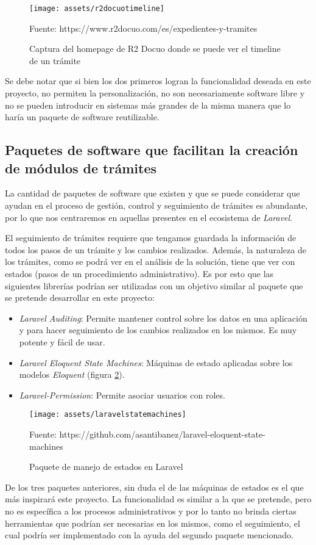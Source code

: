 \begin{figure}[!htpb]
    \centering
    \texttt{[image: assets/r2docuotimeline]}
    \caption{Captura del homepage de R2 Docuo donde se puede ver el timeline de un trámite}{Fuente: https://www.r2docuo.com/es/expedientes-y-tramites}
    \label{fig:r2docuotimeline}
\end{figure}

Se debe notar que si bien los dos primeros logran la funcionalidad deseada en este proyecto, no permiten la personalización, no son necesariamente software libre y no se pueden introducir en sistemas más grandes de la misma manera que lo haría un paquete de software reutilizable.

\subsection{Paquetes de software que facilitan la creación de módulos de trámites}

La cantidad de paquetes de software que existen y que se puede considerar que ayudan en el proceso de gestión, control y seguimiento de trámites es abundante, por lo que nos centraremos en aquellas presentes en el ecosistema de \textit{Laravel}.

El seguimiento de trámites requiere que tengamos guardada la información de todos los pasos de un trámite y los cambios realizados. Además, la naturaleza de los trámites, como se podrá ver en el análisis de la solución, tiene que ver con estados (pasos de un procedimiento administrativo). Es por esto que las siguientes librerías podrían ser utilizadas con un objetivo similar al paquete que se pretende desarrollar en este proyecto:

\begin{itemize}
    \item \textit{Laravel Auditing}: Permite mantener control sobre los datos en una aplicación y para hacer seguimiento de los cambios realizados en los mismos. Es muy potente y fácil de usar.
    \item \textit{Laravel Eloquent State Machines}: Máquinas de estado aplicadas sobre los modelos \textit{Eloquent} (figura \ref{fig:laravelstatemachines}).
    \item \textit{Laravel-Permission}: Permite asociar usuarios con roles.
\end{itemize}

\begin{figure}[!htpb]
    \centering
    \texttt{[image: assets/laravelstatemachines]}
    \caption{Paquete de manejo de estados en Laravel}{Fuente: https://github.com/asantibanez/laravel-eloquent-state-machines}
    \label{fig:laravelstatemachines}
\end{figure}

De los tres paquetes anteriores, sin duda el de las máquinas de estados es el que más inspirará este proyecto. La funcionalidad es similar a la que se pretende, pero no es específica a los procesos administrativos y por lo tanto no brinda ciertas herramientas que podrían ser necesarias en los mismos, como el seguimiento, el cual podría ser implementado con la ayuda del segundo paquete mencionado.
